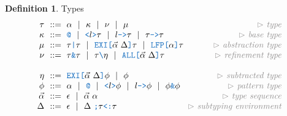 \documentclass[acmsmall]{acmart}
\theoremstyle{definition}
\newtheorem{definition}{Definition}[section]
\begin{document}
\begin{definition} Types 
  \label{def:types}
  \[\begin{array}[t]{r@{}l@{}r}
    \nonterm{\tau} & \is 
    \begin{array}[t]{@{}l}
      \alpha \sep
      \kappa \sep \nu \sep \mu
    \end{array}
    & \com{type}
    \\
    \nonterm{\kappa} & \is 
    \begin{array}[t]{@{}l}
      \obj{@} \sep
      \obj{<}l\obj{>}\tau \sep 
      l\obj{->}\tau \sep 
      \tau\obj{->}\tau
    \end{array}
    & \com{base type}
    \\
    \nonterm{\mu} & \is 
    \begin{array}[t]{@{}l}
      \tau\obj{|}\tau \sep 
      \obj{EXI[}\vec{\alpha}\ \Delta \obj{]} \tau \sep 
      \obj{LFP[}\alpha\obj{]}\tau
    \end{array}
    & \com{abstraction type}
    \\
    \nonterm{\nu} & \is 
    \begin{array}[t]{@{}l}
      \tau\obj{\&}\tau \sep 
      \tau\obj{\textbackslash}\eta \sep 
      \obj{ALL[}\vec{\alpha}\ \Delta \obj{]} \tau
    \end{array}
    & \com{refinement type}
    \\\\
    \nonterm{\eta} & \is 
    \begin{array}[t]{@{}l}
      \obj{EXI[}\vec{\alpha}\ \Delta \obj{]} \phi \sep 
      \phi
    \end{array}
    & \com{subtracted type}
    \\
    \nonterm{\phi} & \is 
    \begin{array}[t]{@{}l}
      \alpha \sep
      \obj{@} \sep
      \obj{<}l\obj{>}\phi \sep 
      l\obj{->}\phi \sep 
      \phi\obj{\&}\phi
    \end{array}
    & \com{pattern type}
    \\
    \nonterm{\vec{\alpha}} & \is \epsilon \sep \vec{\alpha}\ \alpha 
    & \com{type sequence}
    \\
    \nonterm{\Delta} & \is \epsilon \sep \Delta\ \obj{;} \tau \obj{<:} \tau
    & \com{subtyping environment}
  \end{array}\]
\end{definition}
\end{document}
